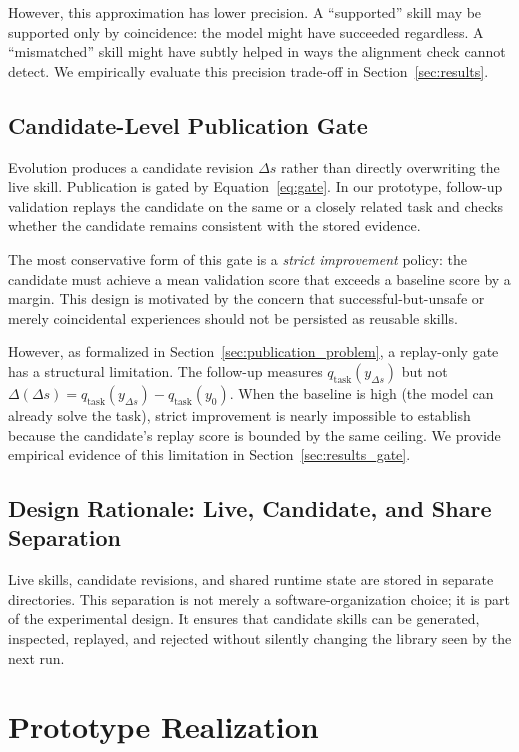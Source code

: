 ﻿\documentclass[preprint,12pt]{elsarticle}
\begin{document}
However, this approximation has lower precision.  A ``supported'' skill may
be supported only by coincidence: the model might have succeeded regardless.
A ``mismatched'' skill might have subtly helped in ways the alignment check
cannot detect.  We empirically evaluate this precision trade-off in
Section~\ref{sec:results}.

\subsection{Candidate-Level Publication Gate}
\label{sec:gate}

Evolution produces a candidate revision $\Delta s$ rather than directly
overwriting the live skill.  Publication is gated by
Equation~\ref{eq:gate}.  In our prototype, follow-up validation replays the
candidate on the same or a closely related task and checks whether the
candidate remains consistent with the stored evidence.

The most conservative form of this gate is a \emph{strict improvement}
policy: the candidate must achieve a mean validation score that exceeds a
baseline score by a margin.  This design is motivated by the concern that
successful-but-unsafe or merely coincidental experiences should not be
persisted as reusable skills.

However, as formalized in Section~\ref{sec:publication_problem}, a
replay-only gate has a structural limitation.  The follow-up measures
$q_{\mathrm{task}}(y_{\Delta s})$ but not
$\Delta(\Delta s) = q_{\mathrm{task}}(y_{\Delta s}) -
q_{\mathrm{task}}(y_0)$.  When the baseline is high (the model can already
solve the task), strict improvement is nearly impossible to establish
because the candidate's replay score is bounded by the same ceiling.  We
provide empirical evidence of this limitation in
Section~\ref{sec:results_gate}.

\subsection{Design Rationale: Live, Candidate, and Share Separation}

Live skills, candidate revisions, and shared runtime state are stored in
separate directories.  This separation is not merely a
software-organization choice; it is part of the experimental design.  It
ensures that candidate skills can be generated, inspected, replayed, and
rejected without silently changing the library seen by the next run.

\section{Prototype Realization}
\label{sec:implementation}
\end{document}

